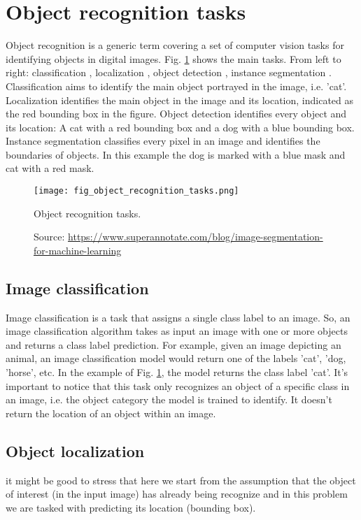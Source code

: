 \section{Object recognition tasks}
Object recognition is a generic term covering a set of computer vision tasks for identifying objects in digital images. Fig. \ref{fig:object_recognition_tasks} shows the main tasks. From left to right: classification \cite{lecun1998gradient}, localization \cite{zhou2016cvpr}, object detection \cite{girshick2014rich}, instance segmentation \cite{He_2017_ICCV}. Classification aims to identify the main object portrayed in the image, i.e. 'cat'. Localization identifies the main object in the image and its location, indicated as the red bounding box in the figure. Object detection identifies every object and its location: A cat with a red bounding box and a dog with a blue bounding box. Instance segmentation classifies every pixel in an image and identifies the boundaries of objects. In this example the dog is marked with a blue mask and cat with a red mask.
\begin{figure}[ht]
    \begin{center}
    \texttt{[image: fig\_object\_recognition\_tasks.png]}
    \caption[Object recognition tasks]{
    Object recognition tasks.}
    \caption*{
    Source: \href{https://www.superannotate.com/blog/image-segmentation-for-machine-learning}{https://www.superannotate.com/blog/image-segmentation-for-machine-learning}}
    \label{fig:object_recognition_tasks}
    \end{center}
\end{figure}

\subsection{Image classification}
Image classification is a task that assigns a single class label to an image. So, an image classification algorithm takes as input an image with one or more objects and returns a class label prediction. For example, given an image depicting an animal, an image classification model would return one of the labels 'cat', 'dog, 'horse', etc. In the example of Fig. \ref{fig:object_recognition_tasks}, the model returns the class label 'cat'. It's important to notice that this task only recognizes an object of a specific class in an image, i.e. the object category the model is trained to identify. It doesn't return the location of an object within an image.

\subsection{Object localization}
it might be good to stress that here we start from the assumption that the object of interest (in the input image) has already being recognize and in this problem we are tasked with predicting its location (bounding box).

